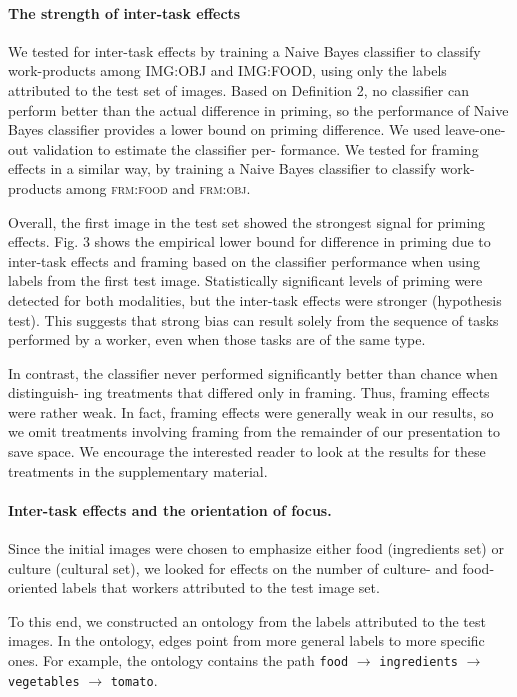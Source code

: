 \documentclass[12pt]{article}
\begin{document}
\paragraph{The strength of inter-task effects}
We tested for inter-task effects by training a Naive Bayes classifier to 
classify work-products among IMG:OBJ and IMG:FOOD, using only the labels 
attributed to the test set of images. Based on Definition 2, no classifier 
can perform better than the actual difference in priming, so the performance 
of Naive Bayes classifier provides a lower bound on priming difference. We 
used leave-one-out validation to estimate the classifier per- formance. We 
tested for framing effects in a similar way, by training a Naive Bayes 
classifier to classify work-products among \textsc{frm:food} and 
\textsc{frm:obj}.

Overall, the first image in the test set showed the strongest signal for 
priming effects. Fig. 3 shows the empirical lower bound for difference in 
priming due to inter-task effects and framing based on the classifier 
performance when using labels from the first test image. Statistically 
significant levels of priming were detected for both modalities, but the 
inter-task effects were stronger (hypothesis test). This suggests that strong 
bias can result solely from the sequence of tasks performed by a worker, even 
when those tasks are of the same type.

In contrast, the classifier never performed significantly better than chance 
when distinguish- ing treatments that differed only in framing. Thus, framing 
effects were rather weak. In fact, framing effects were generally weak in our 
results, so we omit treatments involving framing from the remainder of our 
presentation to save space. We encourage the interested reader to look at the 
results for these treatments in the supplementary material.

\paragraph{Inter-task effects and the orientation of focus.}
Since the initial images were chosen to emphasize either food (ingredients 
set) or culture (cultural set), we looked for effects on the number of 
culture- and food-oriented labels that workers attributed to the test image 
set.

To this end, we constructed an ontology from the labels attributed to the test 
images. In the ontology, edges point from more general labels to more 
specific ones. For example, the ontology contains the path \texttt{food} $\to$ 
\texttt{ingredients} $\to$ \texttt{vegetables} $\to$ \texttt{tomato}.
\end{document}
